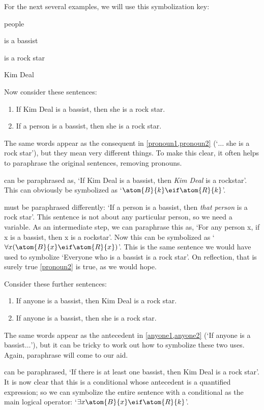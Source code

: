 For the next several examples, we will use this symbolization key:
	\begin{ekey}
		\item[\text{domain}] people
		\item[\atom{B}{x}]  is a bassist
		\item[\atom{R}{x}]  is a rock star
		\item[k] Kim Deal
	\end{ekey}
Now consider these sentences:
	\begin{enumerate}
		\item\label{pronoun1} If Kim Deal is a bassist, then she is a rock star.
		\item\label{pronoun2} If a person is a bassist, then she is a rock star.
	\end{enumerate}
The same words appear as the consequent in \cref*{pronoun1,pronoun2} (`$\ldots$ she is a rock star'), but they mean very different things. To make this clear, it often helps to paraphrase the original sentences, removing pronouns.

 can be paraphrased as, `If Kim Deal is a bassist, then \emph{Kim Deal} is a rockstar'. This can obviously be symbolized as `$\atom{B}{k} \eif \atom{R}{k}$'.

 must be paraphrased differently: `If a person is a bassist, then \emph{that person} is a rock star'. This sentence is not about any particular person, so we need a variable. As an intermediate step, we can paraphrase this as, `For any person x, if x is a bassist, then x is a rockstar'. Now this can be symbolized as `$\forall x (\atom{B}{x} \eif \atom{R}{x})$'. This is the same sentence we would have used to symbolize `Everyone who is a bassist is a rock star'. On reflection, that is surely true \ifeff{} \cref*{pronoun2} is true, as we would hope.

Consider these further sentences:
	\begin{enumerate}
		\item\label{anyone1} If anyone is a bassist, then Kim Deal is a rock star.
		\item\label{anyone2} If anyone is a bassist, then she is a rock star.
	\end{enumerate}
The same words appear as the antecedent in \cref*{anyone1,anyone2}  (`If anyone is a bassist$\ldots$'), but it can be tricky to work out how to symbolize these two uses. Again, paraphrase will come to our aid.

 can be paraphrased, `If there is at least one bassist, then Kim Deal is a rock star'. It is now clear that this is a conditional whose antecedent is a quantified expression; so we can symbolize the entire sentence with a conditional as the main logical operator: `$\exists x \atom{B}{x} \eif \atom{R}{k}$'.

